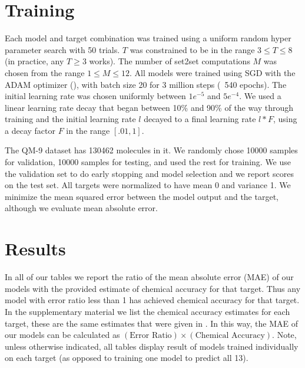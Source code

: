 \documentclass{article}
\begin{document}
\section{Training}

Each model and target combination was trained using a uniform random hyper parameter search with 50 trials. $T$ was constrained to be in the range $3 \leq T \leq 8$ (in practice, any $T \geq 3$ works). The number of set2set computations $M$ was chosen from the range $1 \leq M \leq 12$. All models were trained using SGD with the ADAM optimizer (\citet{kingma2014adam}), with batch size 20 for 3 million steps (~540 epochs). The initial learning rate was chosen uniformly between $1e^{-5}$ and $5e^{-4}$. We used a linear learning rate decay that began between 10\% and 90\% of the way through training and the initial learning rate $l$ decayed to a final learning rate $l*F$, using a decay factor $F$ in the range $[.01, 1]$.

The QM-9 dataset has 130462 molecules in it. We randomly chose 10000 samples for validation, 10000 samples for testing, and used the rest for training. We use the validation set to do early stopping and model selection and we report scores on the test set. All targets were normalized to have mean 0 and variance 1. We minimize the mean squared error between the model output and the target, although we evaluate mean absolute error. 

\section{Results}

   In all of our tables we report the ratio of the mean absolute error (MAE) of our models with the provided estimate of chemical accuracy for that target. Thus any model with error ratio less than 1 has achieved chemical accuracy for that target. In the supplementary material we list the chemical accuracy estimates for each target, these are the same estimates that were given in \citet{colab}. In this way, the MAE of our models can be calculated as $(\textrm{Error Ratio}) \times (\textrm{Chemical Accuracy}) $. Note, unless otherwise indicated, all tables display result of models trained individually on each target (as opposed to training one model to predict all 13).
\end{document}
